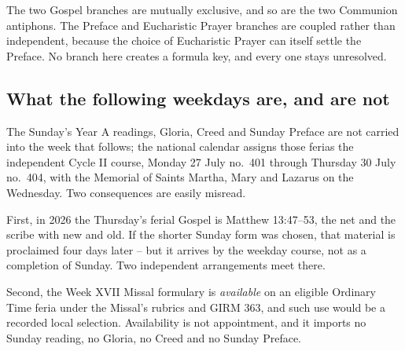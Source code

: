 \begin{branchtable}
\end{branchtable}

The two Gospel branches are mutually exclusive, and so are the two Communion antiphons. The Preface and Eucharistic Prayer branches are coupled rather than independent, because the choice of Eucharistic Prayer can itself settle the Preface. No branch here creates a formula key, and every one stays unresolved.

\subsection*{What the following weekdays are, and are not}

The Sunday's Year A readings, Gloria, Creed and Sunday Preface are not carried into the week that follows; the national calendar assigns those ferias the independent Cycle II course, Monday 27 July no.~401 through Thursday 30 July no.~404, with the Memorial of Saints Martha, Mary and Lazarus on the Wednesday. Two consequences are easily misread.

First, in 2026 the Thursday's ferial Gospel is Matthew 13:47--53, the net and the scribe with new and old. If the shorter Sunday form was chosen, that material is proclaimed four days later -- but it arrives by the weekday course, not as a completion of Sunday. Two independent arrangements meet there.

Second, the Week XVII Missal formulary is \emph{available} on an eligible Ordinary Time feria under the Missal's rubrics and GIRM 363, and such use would be a recorded local selection. Availability is not appointment, and it imports no Sunday reading, no Gloria, no Creed and no Sunday Preface.
